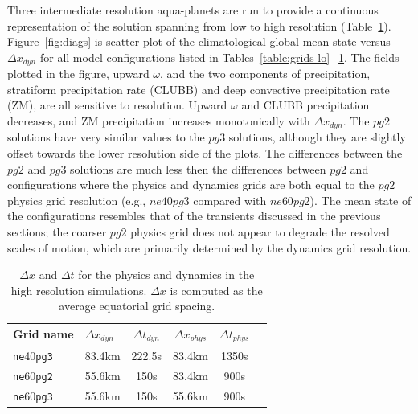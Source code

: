 \documentclass[draft,linenumbers]{agujournal}
\begin{document}
Three intermediate resolution aqua-planets are run to provide a continuous representation of the solution spanning from low to high resolution (Table~\ref{table:grids-med}). Figure~\ref{fig:diags} is scatter plot of the climatological global mean state versus $\Delta x_{dyn}$ for all model configurations listed in Tables~\ref{table:grids-lo}$-$\ref{table:grids-med}. The fields plotted in the figure, upward $\omega$, and the two components of precipitation, stratiform precipitation rate (CLUBB) and deep convective precipitation rate (ZM), are all sensitive to resolution. Upward $\omega$ and CLUBB precipitation decreases, and ZM precipitation increases monotonically with $\Delta x_{dyn}$. The $pg2$ solutions have very similar values to the $pg3$ solutions, although they are slightly offset towards the lower resolution side of the plots. The differences between the $pg2$ and $pg3$ solutions are much less then the differences between $pg2$ and configurations where the physics and dynamics grids are both equal to the $pg2$ physics grid resolution (e.g., $ne40pg3$ compared with $ne60pg2$). The mean state of the configurations resembles that of the transients discussed in the previous sections; the coarser $pg2$ physics grid does not appear to degrade the resolved scales of motion, which are primarily determined by the dynamics grid resolution.

 \begin{table}
 \caption{$\Delta x$ and $\Delta t$ for the physics and dynamics in the high resolution simulations. $\Delta x$ is computed as the average equatorial grid spacing.}
 \centering
 \begin{tabular}{llcccc}
 \hline
 Grid name & $\Delta x_{dyn}$  & $\Delta t_{dyn}$ & $\Delta x_{phys}$  & $\Delta t_{phys}$ \\
 \hline
   {\tt{ne}}40{\tt{pg3}}  & 83.4km & 222.5s  & 83.4km & 1350s \\
   {\tt{ne}}60{\tt{pg2}}  & 55.6km & 150s  & 83.4km & 900s \\
   {\tt{ne}}60{\tt{pg3}}  & 55.6km & 150s  & 55.6km & 900s \\
 \hline
 \end{tabular}
 \label{table:grids-med}
 \end{table}
\end{document}
